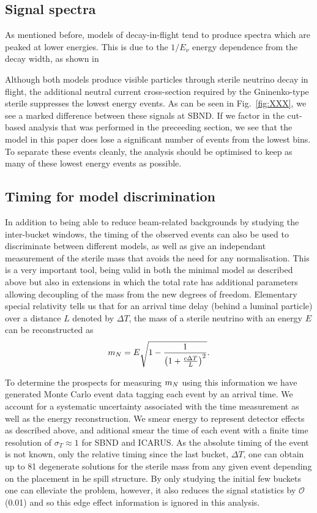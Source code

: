 \documentclass[11pt, a4paper]{article}
\newcommand{\reffig}[1]{Fig.~\ref{#1}}
\def\ster{\ensuremath N}
\begin{document}
\subsection{Signal spectra}

As mentioned before, models of decay-in-flight tend to produce spectra which
are peaked at lower energies. This is due to the $1/E_\nu$ energy dependence from
the decay width, as shown in 

Although both models produce visible particles through sterile neutrino decay
in flight, the additional neutral current cross-section required by the
Gninenko-type sterile suppresses the lowest energy events. As can be seen in
\reffig{fig:XXX}, we see a marked difference between these signals at SBND. If
we factor in the cut-based analysis that was performed in the preceeding
section, we see that the model in this paper does lose a significant number of
events from the lowest bins. To separate these events cleanly, the analysis
should be optimised to keep as many of these lowest energy events as possible. 

\subsection{\label{sec:timing_physics}Timing for model discrimination}

In addition to being able to reduce beam-related backgrounds by studying the
inter-bucket windows, the timing of the observed events can also be used to
discriminate between different models, as well as give an independant
measurement of the sterile mass that avoids the need for any normalisation. This is a very important tool, being valid in both the minimal model as described above but also in extensions in which the total rate has additional parameters allowing decoupling of the mass from the new degrees of freedom. 
Elementary special relativity tells us that for an arrival time delay (behind a luminal particle) over a
distance $L$ denoted by $\Delta T$, the mass of a sterile neutrino with an
energy $E$ can be reconstructed as 
%
\[ m_{\ster} = E\sqrt{1-\frac{1}{\left(1+\frac{c\Delta T}{L}\right)^2}}. \]

To determine the prospects for measuring $m_{\ster}$ using this information we
have generated Monte Carlo event data tagging each event by an arrival time.
We account for a systematic uncertainty associated with the time measurement as
well as the energy reconstruction. We smear energy to represent detector
effects as described above, and aditional smear the time of each event with a
finite time resolution of $\sigma_T  \approx 1$ for SBND and ICARUS. As the
absolute timing of the event is not known, only the relative timing since the
last bucket, $\Delta T$, one can obtain up to 81 degenerate solutions for the
sterile mass from any given event depending on the placement in he spill
structure. By only studying the initial few buckets one can elleviate the
problem, however, it also reduces the signal statistics by $\mathcal{O}$(0.01)
and so this edge effect information is ignored in this analysis. \\
\end{document}
